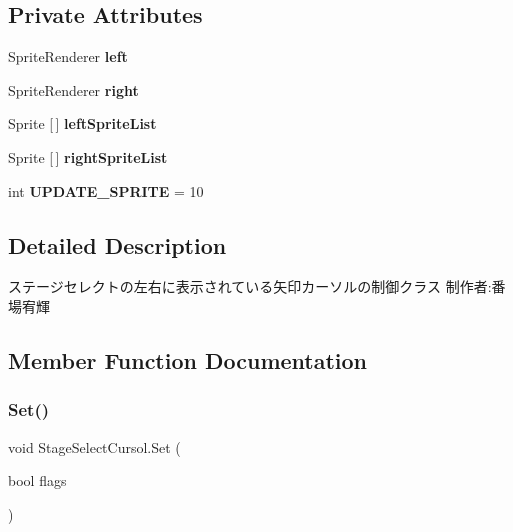 \subsection*{Private Attributes}
\begin{DoxyCompactItemize}
\item 
\mbox{\label{class_stage_select_cursol_a8e95d00acb65565aa626902da41dc6bc}} 
Sprite\+Renderer {\bfseries left}
\item 
\mbox{\label{class_stage_select_cursol_ae1b010447c26e09ab61285f74f8c6ee0}} 
Sprite\+Renderer {\bfseries right}
\item 
\mbox{\label{class_stage_select_cursol_a54c75de0bbf82848c3baf6d640ae7ddf}} 
Sprite \mbox{[}$\,$\mbox{]} {\bfseries left\+Sprite\+List}
\item 
\mbox{\label{class_stage_select_cursol_aa9f306e353905c9b14cea17646fcc1fb}} 
Sprite \mbox{[}$\,$\mbox{]} {\bfseries right\+Sprite\+List}
\item 
\mbox{\label{class_stage_select_cursol_a51d870767cc85b70487fe13d56ddacd1}} 
int {\bfseries U\+P\+D\+A\+T\+E\+\_\+\+S\+P\+R\+I\+TE} = 10
\end{DoxyCompactItemize}


\subsection{Detailed Description}
ステージセレクトの左右に表示されている矢印カーソルの制御クラス 制作者\+:番場宥輝 



\subsection{Member Function Documentation}
\mbox{\label{class_stage_select_cursol_abc3fdba5889193a4279766151081e6c5}} 
\subsubsection{\texorpdfstring{Set()}{Set()}}
{\footnotesize\ttfamily void Stage\+Select\+Cursol.\+Set (\begin{DoxyParamCaption}\item[{bool}]{flags }\end{DoxyParamCaption})\hspace{0.3cm}{\ttfamily [inline]}}



